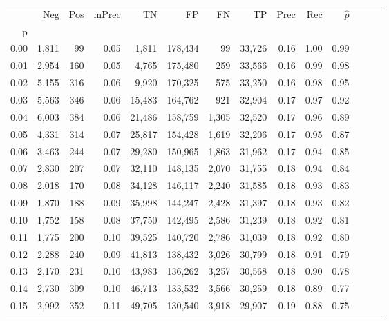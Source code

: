 \begin{tabular}{rrrrrrrrrrrrrr}
\toprule
{} &    Neg &  Pos & mPrec &       TN &       FP &      FN &      TP &  Prec &   Rec & $\hat{p}$ \\
p    &        &      &       &          &          &         &         &       &       &           \\
\midrule
0.00 &  1,811 &   99 &  0.05 &    1,811 &  178,434 &      99 &  33,726 &  0.16 &  1.00 &      0.99 \\
0.01 &  2,954 &  160 &  0.05 &    4,765 &  175,480 &     259 &  33,566 &  0.16 &  0.99 &      0.98 \\
0.02 &  5,155 &  316 &  0.06 &    9,920 &  170,325 &     575 &  33,250 &  0.16 &  0.98 &      0.95 \\
0.03 &  5,563 &  346 &  0.06 &   15,483 &  164,762 &     921 &  32,904 &  0.17 &  0.97 &      0.92 \\
0.04 &  6,003 &  384 &  0.06 &   21,486 &  158,759 &   1,305 &  32,520 &  0.17 &  0.96 &      0.89 \\
0.05 &  4,331 &  314 &  0.07 &   25,817 &  154,428 &   1,619 &  32,206 &  0.17 &  0.95 &      0.87 \\
0.06 &  3,463 &  244 &  0.07 &   29,280 &  150,965 &   1,863 &  31,962 &  0.17 &  0.94 &      0.85 \\
0.07 &  2,830 &  207 &  0.07 &   32,110 &  148,135 &   2,070 &  31,755 &  0.18 &  0.94 &      0.84 \\
0.08 &  2,018 &  170 &  0.08 &   34,128 &  146,117 &   2,240 &  31,585 &  0.18 &  0.93 &      0.83 \\
0.09 &  1,870 &  188 &  0.09 &   35,998 &  144,247 &   2,428 &  31,397 &  0.18 &  0.93 &      0.82 \\
0.10 &  1,752 &  158 &  0.08 &   37,750 &  142,495 &   2,586 &  31,239 &  0.18 &  0.92 &      0.81 \\
0.11 &  1,775 &  200 &  0.10 &   39,525 &  140,720 &   2,786 &  31,039 &  0.18 &  0.92 &      0.80 \\
0.12 &  2,288 &  240 &  0.09 &   41,813 &  138,432 &   3,026 &  30,799 &  0.18 &  0.91 &      0.79 \\
0.13 &  2,170 &  231 &  0.10 &   43,983 &  136,262 &   3,257 &  30,568 &  0.18 &  0.90 &      0.78 \\
0.14 &  2,730 &  309 &  0.10 &   46,713 &  133,532 &   3,566 &  30,259 &  0.18 &  0.89 &      0.77 \\
0.15 &  2,992 &  352 &  0.11 &   49,705 &  130,540 &   3,918 &  29,907 &  0.19 &  0.88 &      0.75 \\

\end{tabular}
